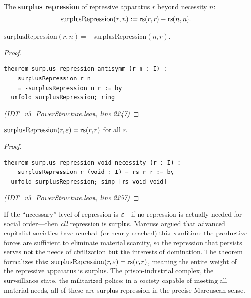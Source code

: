 \begin{definition}
\label{def:surplus-repression}
The \textbf{surplus repression} of repressive apparatus $r$ beyond necessity $n$:
\[
  \mathrm{surplusRepression}(r, n) := \mathrm{rs}(r, r) - \mathrm{rs}(n, n).
\]
\end{definition}

\begin{theorem}
\label{thm:surplus-antisymm}
$\mathrm{surplusRepression}(r, n) = -\mathrm{surplusRepression}(n, r)$.
\end{theorem}

\begin{proof}
\begin{lstlisting}
theorem surplus_repression_antisymm (r n : I) :
    surplusRepression r n
    = -surplusRepression n r := by
  unfold surplusRepression; ring
\end{lstlisting}
\textit{(IDT\_v3\_PowerStructure.lean, line 2247)}
\end{proof}

\begin{theorem}
\label{thm:surplus-void}
$\mathrm{surplusRepression}(r, \varepsilon) = \mathrm{rs}(r, r)$ for all $r$.
\end{theorem}

\begin{proof}
\begin{lstlisting}
theorem surplus_repression_void_necessity (r : I) :
    surplusRepression r (void : I) = rs r r := by
  unfold surplusRepression; simp [rs_void_void]
\end{lstlisting}
\textit{(IDT\_v3\_PowerStructure.lean, line 2257)}
\end{proof}

\begin{interpretation}
If the ``necessary'' level of repression is $\varepsilon$---if no repression
is actually needed for social order---then \emph{all} repression is surplus.
Marcuse argued that advanced capitalist societies have reached (or nearly
reached) this condition: the productive forces are sufficient to eliminate
material scarcity, so the repression that persists serves not the needs of
civilization but the interests of domination. The theorem formalizes this:
$\mathrm{surplusRepression}(r, \varepsilon) = \mathrm{rs}(r,r)$, meaning the entire
weight of the repressive apparatus is surplus. The prison-industrial complex,
the surveillance state, the militarized police: in a society capable of
meeting all material needs, all of these are surplus repression in the
precise Marcusean sense.
\end{interpretation}

